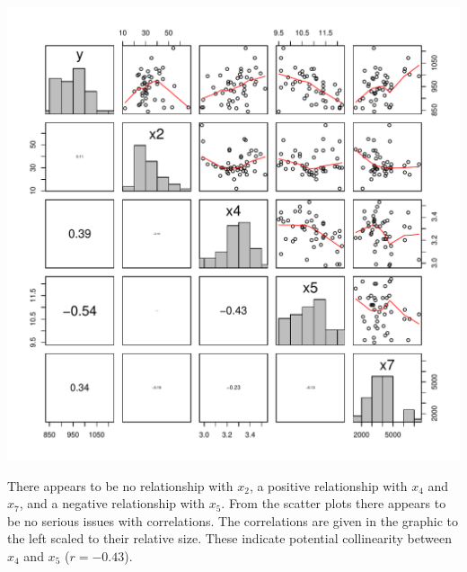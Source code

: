 \documentclass{homework}
\begin{document}
\begin{longproblem}
  \begin{minipage}{.5\textwidth}
  \includegraphics[width=\textwidth]{pollution_pairs.pdf}
  \end{minipage}
  \begin{minipage}{.5\textwidth}
    There appears to be no relationship with $x_2$, a positive relationship with
    $x_4$ and $x_7$, and a negative relationship with $x_5$.  From the scatter
    plots there appears to be no serious issues with correlations.  The
    correlations are given in the graphic to the left scaled to their relative
    size.  These indicate potential collinearity between $x_4$ and $x_5$ ($r =
    -0.43$).
  \end{minipage}


\end{longproblem}
\end{document}
